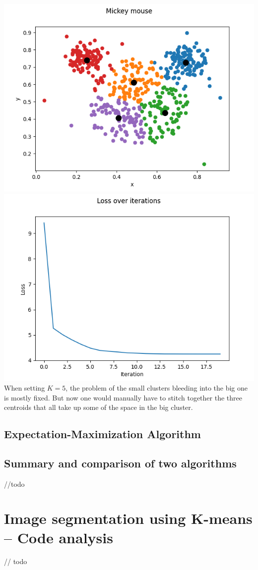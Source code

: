     \includegraphics[width=\textwidth / 2]{plots/mickey_k5}
    \includegraphics[width=\textwidth / 2]{plots/mickey_k5_loss}
    When setting $K=5$, the problem of the small clusters bleeding into the big one is mostly fixed.
    But now one would manually have to stitch together the three centroids that all take up some of the space in the big cluster.

    \subsection{Expectation-Maximization Algorithm}


    \subsection{Summary and comparison of two algorithms}
    //todo

    \section{Image segmentation using K-means -- Code analysis}
    // todo




